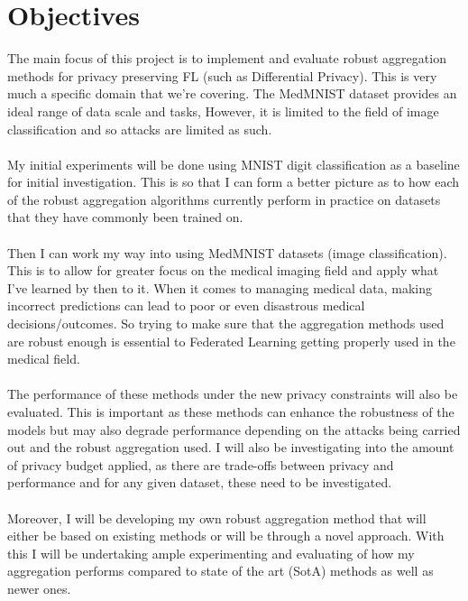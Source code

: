 \section{Objectives}
The main focus of this project is to implement and evaluate robust aggregation methods for privacy preserving FL (such as Differential Privacy).
This is very much a specific domain that we're covering. 
The MedMNIST dataset provides an ideal range of data scale and tasks, 
However, it is limited to the field of image classification and so attacks are limited as such.
\\ \\
My initial experiments will be done using MNIST \cite{mnist} digit classification as a baseline for initial investigation.
This is so that I can form a better picture as to how each of the robust aggregation algorithms currently perform in practice on datasets that they have commonly been trained on.
\\ \\
Then I can work my way into using MedMNIST datasets \cite{medmnist} (image classification). 
This is to allow for greater focus on the medical imaging field and apply what I've learned by then to it.
When it comes to managing medical data, making incorrect predictions can lead to poor or even disastrous medical decisions/outcomes.
So trying to make sure that the aggregation methods used are robust enough is essential to Federated Learning getting properly used in the medical field.
\\ \\
The performance of these methods under the new privacy constraints will also be evaluated.
This is important as these methods can enhance the robustness of the models but may also degrade performance depending on the attacks being carried out and the robust aggregation used.
I will also be investigating into the amount of privacy budget applied, as there are trade-offs between privacy and performance and for any given dataset, these need to be investigated.
\\ \\
Moreover, I will be developing my own robust aggregation method that will either be based on existing methods or will be through a novel approach.
With this I will be undertaking ample experimenting and evaluating of how my aggregation performs compared to state of the art (SotA) methods as well as newer ones.




